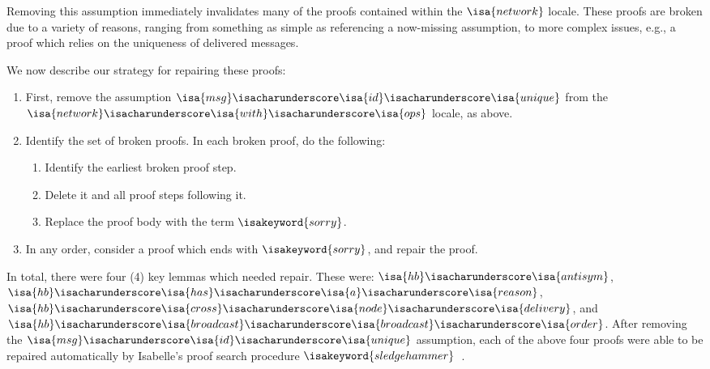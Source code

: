 Removing this assumption immediately invalidates many of the proofs contained
within the $\isa{network}$ locale. These proofs are broken due to a variety of
reasons, ranging from something as simple as referencing a now-missing
assumption, to more complex issues, e.g., a proof which relies on the uniqueness
of delivered messages.

We now describe our strategy for repairing these proofs:
\begin{enumerate}
  \item First, remove the assumption
    $\isa{msg}\isacharunderscore\isa{id}\isacharunderscore\isa{unique}$ from the
    $\isa{network}\isacharunderscore\isa{with}\isacharunderscore\isa{ops}$
    locale, as above.
  \item Identify the set of broken proofs. In each broken proof, do the
    following:
    \begin{enumerate}
      \item Identify the earliest broken proof step.
      \item Delete it and all proof steps following it.
      \item Replace the proof body with the term $\isakeyword{sorry}$.
    \end{enumerate}
  \item In any order, consider a proof which ends with $\isakeyword{sorry}$, and
    repair the proof.
\end{enumerate}

In total, there were four (4) key lemmas which needed repair. These were:
$\isa{hb}\isacharunderscore\isa{antisym}$,
$\isa{hb}\isacharunderscore\isa{has}\isacharunderscore\isa{a}\isacharunderscore\isa{reason}$,
$\isa{hb}\isacharunderscore\isa{cross}\isacharunderscore\isa{node}\isacharunderscore\isa{delivery}$, and
$\isa{hb}\isacharunderscore\isa{broadcast}\isacharunderscore\isa{broadcast}\isacharunderscore\isa{order}$.
After removing the
$\isa{msg}\isacharunderscore\isa{id}\isacharunderscore\isa{unique}$ assumption,
each of the above four proofs were able to be repaired automatically by
Isabelle's proof search procedure $\isakeyword{sledgehammer}$~\citep{wenzel02}.

